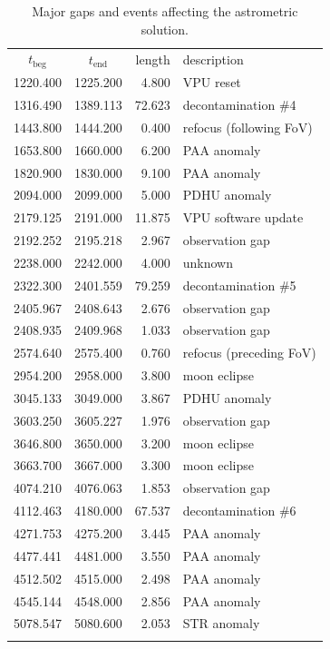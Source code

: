 \documentclass[longauth]{aa} %
\begin{document}
\begin{table}
\caption{Major gaps and events affecting the astrometric solution.
\label{tab:gaps}}
\small
\begin{tabular}{ccrl}
\hline\hline
\noalign{\smallskip}
$t_\text{beg}$ & $t_\text{end}$ & length & description\\
\noalign{\smallskip}
\hline
\noalign{\smallskip}
1220.400 & 1225.200 & 4.800 & VPU reset \\
1316.490 & 1389.113 & 72.623 & decontamination {\#}4 \\
1443.800 & 1444.200 & 0.400 & refocus (following FoV) \\
1653.800 & 1660.000 & 6.200 & PAA anomaly \\
1820.900 & 1830.000 & 9.100 & PAA anomaly \\
2094.000 & 2099.000 & 5.000 & PDHU anomaly \\
2179.125 & 2191.000 & 11.875 & VPU software update \\
2192.252 & 2195.218 & 2.967 & observation gap\\
2238.000 & 2242.000 & 4.000 & unknown \\
2322.300 &	2401.559 & 79.259 & decontamination {\#}5 \\
2405.967 & 2408.643 & 2.676 & observation gap\\
2408.935 & 2409.968 & 1.033 & observation gap\\
2574.640 &	2575.400 & 0.760 & refocus (preceding FoV) \\
2954.200 & 2958.000 & 3.800 & moon eclipse \\
3045.133 & 3049.000 & 3.867 & PDHU anomaly\\
3603.250 & 3605.227 & 1.976 & observation gap\\
3646.800 & 3650.000 & 3.200 & moon eclipse \\
3663.700 & 3667.000 & 3.300 & moon eclipse \\
4074.210 & 4076.063 & 1.853 & observation gap\\
4112.463 & 4180.000 & 67.537 & decontamination {\#}6 \\
4271.753 & 4275.200 & 3.445 & PAA anomaly \\
4477.441 & 4481.000 & 3.550 & PAA anomaly \\
4512.502 & 4515.000 & 2.498 & PAA anomaly \\
4545.144 & 4548.000 & 2.856 & PAA anomaly \\
5078.547 & 5080.600 & 2.053 & STR anomaly \\
\noalign{\smallskip}
\hline
\end{tabular}
\end{table}
\end{document}
